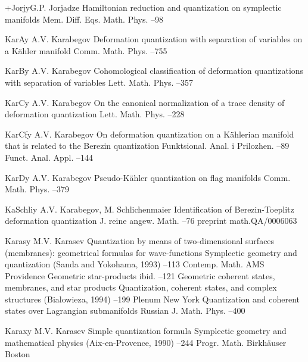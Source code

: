 \documentclass[11pt]{amsart}
\numberwithin{equation}{section}
\theoremstyle{remark}
\newcommand{\by}{\mathbf y}
\begin{document}
\begin{thebibliography}{199}
 +Jorj\by{G.P. Jorjadze \paper Hamiltonian reduction and quantization on
symplectic manifolds \jour Mem. Diff. Eqs. Math. Phys.  
--98}

 KarA\by{ A.V. Karabegov \paper Deformation quantization with separation
of variables on a K\"ahler manifold \jour Comm. Math. Phys.  
--755}

 KarB\by{ A.V. Karabegov \paper Cohomological classification of
deformation quantizations with separation of variables \jour Lett. Math. Phys.
  --357}

 KarC\by{ A.V. Karabegov \paper On the canonical normalization of a trace
density of deformation quantization \jour Lett. Math. Phys.  
--228}

 KarCf\by{ A.V. Karabegov \paper On deformation quantization on a
K\"ahlerian manifold that is related to the Berezin quantization \jour
Funktsional. Anal. i Prilozhen.   --89 \transl
Funct. Anal. Appl.   --144}

 KarD\by{ A.V. Karabegov \paper Pseudo-K\"ahler quantization on flag
manifolds \jour Comm. Math. Phys.   --379}

 KaSchli\by{ A.V. Karabegov, M. Schlichenmaier \paper Identification of
Berezin-Toeplitz deformation quantization \jour J. reine angew. Math. 
 --76 \paperinfo preprint math.QA/0006063}

 Karas\by{ M.V. Karasev \paper Quantization by means of two-dimensional
surfaces (membranes): geometrical formulas for wave-functions \inbook
Symplectic geometry and quantization (Sanda and Yokohama, 1993) --113
\bookinfo Contemp. Math.  \publ AMS \publaddr Providence 
\moreref \paper Geometric star-products \inbook ibid. --121 \moreref
\paper Geometric coherent states, membranes, and star products \inbook
Quantization, coherent states, and complex structures (Bialowieza, 1994) --199 \publ Plenum \publaddr New York  \moreref \paper Quantization
and coherent states over Lagrangian submanifolds \jour Russian J. Math. Phys.
  --400}

 Karax\by{ M.V. Karasev \paper Simple quantization formula \inbook
Symplectic geometry and mathematical physics (Aix-en-Provence, 1990) --244 \bookinfo Progr. Math.  \publ Birkh\"auser \publaddr Boston
}


\end{thebibliography}
\end{document}
